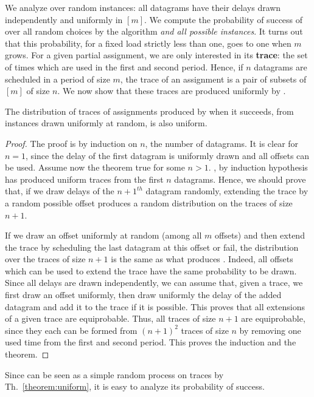 We analyze \greedyuniform over random instances:  all datagrams have 
their delays drawn independently and uniformly in $[m]$. We compute the probability of success of \greedyuniform over all random choices by the algorithm \emph{and all possible instances}. 
It turns out that this probability, for a fixed load strictly less than one, goes to one when $m$ grows. 
For a given partial assignment, we are only interested in its \textbf{trace}: the set of times which are used in the first and second period. Hence, if $n$ datagrams are scheduled in a period of size $m$, the trace of an assignment is a pair of subsets of $[m]$ of size $n$. We now show that these traces are produced uniformly by \greedyuniform.

\begin{theorem}
The distribution of traces of assignments produced by \greedyuniform when it succeeds, from instances drawn uniformly at random, is also uniform.
\end{theorem}
\begin{proof}
The proof is by induction on $n$, the number of datagrams. It is clear for $n=1$,
since the delay of the first datagram is uniformly drawn and all offsets can be used.
Assume now the theorem true for some $n>1$. \greedyuniform, by induction hypothesis has produced
uniform traces from the first $n$ datagrams.  Hence, we should prove that, if we draw delays
of the $n+1^{th}$ datagram randomly, extending the trace by a random possible offset produces a random distribution on the traces of size $n+1$. 

 If we draw an offset uniformly at random (among all $m$ offsets) and then extend the trace by scheduling the last datagram at this offset or fail, the distribution over the traces of size $n+1$ is the same as what produces \greedyuniform. Indeed, all offsets which can be used to extend the trace have the same probability to be drawn. Since all delays are drawn independently, we can assume that, given a trace, we first draw an offset uniformly, then draw uniformly the delay of the added datagram and add it to the trace if it is possible. This proves that all extensions of a given trace are equiprobable. Thus, all traces of size $n+1$ are equiprobable, since they each can be formed from $(n+1)^2$ traces of size $n$ by removing one used time from the first and second period. This proves the induction and the theorem.
\end{proof}

Since \greedyuniform can be seen as a simple random process on traces by Th.~\ref{theorem:uniform}, it is easy to analyze its probability of success.

